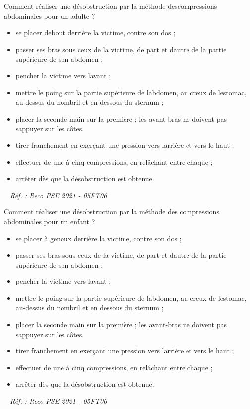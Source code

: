 \documentclass[grid,avery5371,landscape]{flashcards}
\makeatletter
\newcounter{nocarte}
\newcommand{\categ}[1]{%
  \def\@categ{#1}%
  \setcounter{nocarte}{0}%
}
\newcommand{\source}[1]{%
  \medskip
  \itshape%
   ~ \hfill Réf. : #1}
\makeatother
\begin{document}
\color[HTML]{003273}
\categ{PSE}
\begin{flashcard}[geste]{
 Comment réaliser une désobstruction par la méthode descompressions abdominales pour un adulte ?   }
  \begin{itemize} 
\item se placer debout derrière la victime, contre son dos ;
\item passer ses bras sous ceux de la victime, de part et dautre de la partie supérieure de son abdomen ;
\item pencher la victime vers lavant ;
\item mettre le poing sur la partie supérieure de labdomen, au creux de lestomac, au-dessus du nombril et en dessous du sternum ;
\item placer la seconde main sur la première ; les avant-bras ne doivent pas sappuyer sur les côtes.
\item tirer franchement en exerçant une pression vers larrière et vers le haut ;
\item effectuer de une à cinq compressions, en relâchant entre chaque ;
\item arrêter dès que la désobstruction est obtenue. \end{itemize}
  \source{Reco PSE 2021 - 05FT06}
\end{flashcard}


\color[HTML]{003273}
\categ{PSE}
\begin{flashcard}[geste]{
 Comment réaliser une désobstruction par la méthode des compressions abdominales pour un enfant ?   }
  \begin{itemize} 
\item se placer à genoux derrière la victime, contre son dos ;
\item passer ses bras sous ceux de la victime, de part et dautre de la partie supérieure de son abdomen ;
\item pencher la victime vers lavant ;
\item mettre le poing sur la partie supérieure de labdomen, au creux de lestomac, au-dessus du nombril et en dessous du sternum ;
\item placer la seconde main sur la première ; les avant-bras ne doivent pas sappuyer sur les côtes.
\item tirer franchement en exerçant une pression vers larrière et vers le haut ;
\item effectuer de une à cinq compressions, en relâchant entre chaque ;
\item arrêter dès que la désobstruction est obtenue. \end{itemize}
  \source{Reco PSE 2021 - 05FT06}
\end{flashcard}
\end{document}
